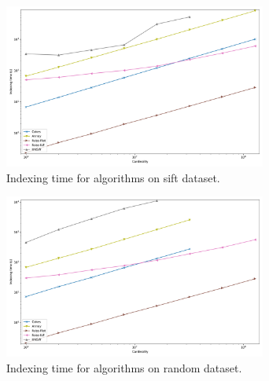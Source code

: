 \documentclass{article}
\begin{document}
\begin{figure}[ht!]
    \centering
    \includegraphics[width=3.4in]{plots/sift-indexing.png}
    \caption{
        Indexing time for algorithms on sift dataset. 
    }
    \label{fig:supplement:sift-indexing}
\end{figure}

\begin{figure}[ht!]
    \centering
    \includegraphics[width=3.4in]{plots/random-1000000-128-indexing.png}
    \caption{
        Indexing time for algorithms on random dataset. 
    }
    \label{fig:supplement:random-indexing}
\end{figure}
\end{document}
